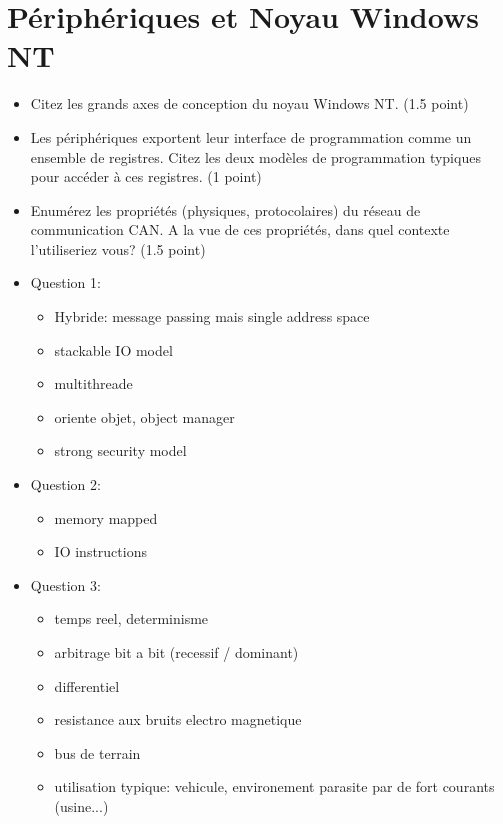 \section{P\'eriph\'eriques et Noyau Windows NT
         }

\begin{itemize}
\item
  Citez les grands axes de conception du noyau Windows NT. (1.5 point)
\item
  Les p\'eriph\'eriques exportent leur interface de programmation comme un ensemble
  de registres. Citez les deux mod\`eles de programmation typiques pour acc\'eder
  \`a ces registres. (1 point)
\item
  Enum\'erez les propri\'et\'es (physiques, protocolaires) du r\'eseau de communication
  CAN. A la vue de ces propri\'et\'es, dans quel contexte l'utiliseriez vous? (1.5 point)
\end{itemize}

\begin{correction}
\begin{itemize}
  \item Question 1:
    \begin{itemize}
    \item Hybride: message passing mais single address space
    \item stackable IO model
    \item multithreade
    \item oriente objet, object manager
    \item strong security model
    \end{itemize}
  \item Question 2:
    \begin{itemize}
    \item memory mapped
    \item IO instructions
    \end{itemize}
  \item Question 3:
    \begin{itemize}
    \item temps reel, determinisme
    \item arbitrage bit a bit (recessif / dominant)
    \item differentiel
    \item resistance aux bruits electro magnetique
    \item bus de terrain
    \item utilisation typique: vehicule, environement parasite par de fort courants (usine...)
    \end{itemize}
\end{itemize}
\end{correction}


